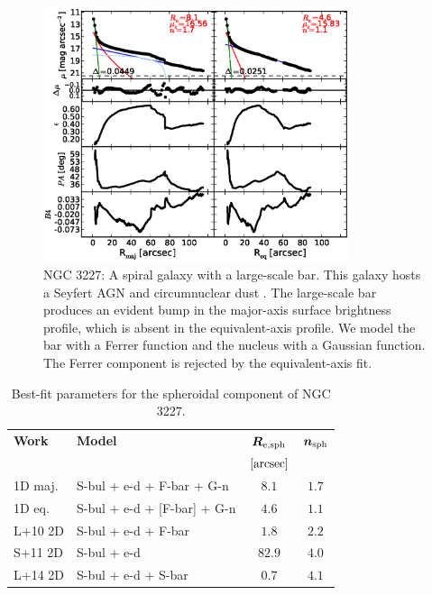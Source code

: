 \documentclass[preprint2]{emulateapj}
\newcommand{\fitfigurewidth}{0.8\textwidth}
\begin{document}
  \begin{figure}[h]
  \begin{center}
  \includegraphics[width=\fitfigurewidth]{n3227_1Dfit.eps}
  \caption{NGC 3227: 
  A spiral galaxy with a large-scale bar. 
  This galaxy hosts a Seyfert AGN \citep{khachikian1974} and circumnuclear dust \citep{martini2003}. 
  The large-scale bar produces an evident bump in the major-axis surface brightness profile,
  which is absent in the equivalent-axis profile. 
  We model the bar with a Ferrer function and the nucleus with a Gaussian function. 
  The Ferrer component is rejected by the equivalent-axis fit. 
  }
  \end{center}
  \end{figure}

  \begin{table}[h]
  \small
  \caption{Best-fit parameters for the spheroidal component of NGC 3227.}
  \begin{center}
  \begin{tabular}{llcc}
  \hline
  {\bf Work} & {\bf Model}   & $\bm R_{\rm e,sph}$    & $\bm n_{\rm sph}$ \\
    &  &  $[\rm arcsec]$ & \\
  \hline
  1D maj. & S-bul + e-d + F-bar + G-n   & $8.1$  &  $1.7$ \\
  1D eq.  & S-bul + e-d + [F-bar] + G-n & $4.6$  &  $1.1$ \\
  \hline
  L+10 2D         & S-bul + e-d + F-bar & $1.8$  &  $2.2$ \\
  S+11 2D         & S-bul + e-d	     & $82.9$ &  $4.0$ \\
  L+14 2D         & S-bul + e-d + S-bar & $0.7$  &  $4.1$ \\
  \hline
  \end{tabular}
  \end{center}
  \label{tab:n3227}
  \end{table}
\end{document}
